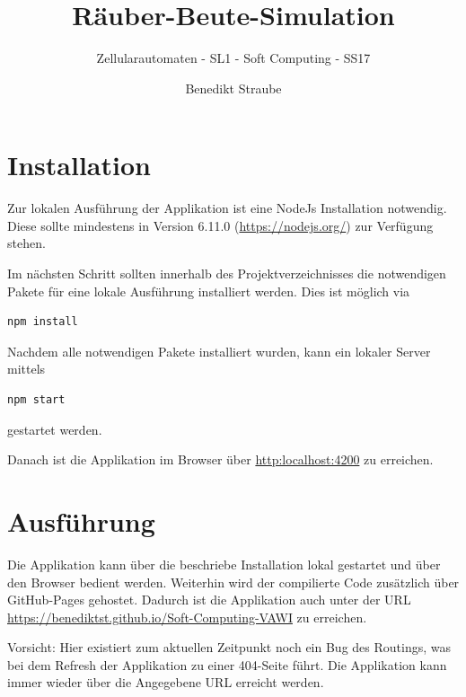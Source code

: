 \documentclass[]{scrartcl}
\title{Räuber-Beute-Simulation}
\subtitle{Zellularautomaten - SL1 - Soft Computing - SS17}
\author{Benedikt Straube}
\begin{document}
\maketitle

\newpage

\section{Installation}
Zur lokalen Ausführung der Applikation ist eine NodeJs Installation notwendig. Diese sollte mindestens in Version 6.11.0 (\url{https://nodejs.org/}) zur Verfügung stehen.

Im nächsten Schritt sollten innerhalb des Projektverzeichnisses die notwendigen Pakete für eine lokale Ausführung installiert werden. Dies ist möglich via 
\begin{lstlisting}[backgroundcolor=\color{lightgray}]
npm install
\end{lstlisting}

Nachdem alle notwendigen Pakete installiert wurden, kann ein lokaler Server mittels
\begin{lstlisting}[backgroundcolor=\color{lightgray}]
npm start
\end{lstlisting}
gestartet werden.

Danach ist die Applikation im Browser über \url{http:localhost:4200} zu erreichen.

\newpage
\section{Ausführung}
\label{ausfuehrung}
Die Applikation kann über die beschriebe Installation lokal gestartet und über den Browser bedient werden. Weiterhin wird der compilierte Code zusätzlich über GitHub-Pages gehostet. Dadurch ist die Applikation auch unter der URL \url{https://benediktst.github.io/Soft-Computing-VAWI} zu erreichen.

Vorsicht: Hier existiert zum aktuellen Zeitpunkt noch ein Bug des Routings, was bei dem Refresh der Applikation zu einer 404-Seite führt. Die Applikation kann immer wieder über die Angegebene URL erreicht werden.
\end{document}
